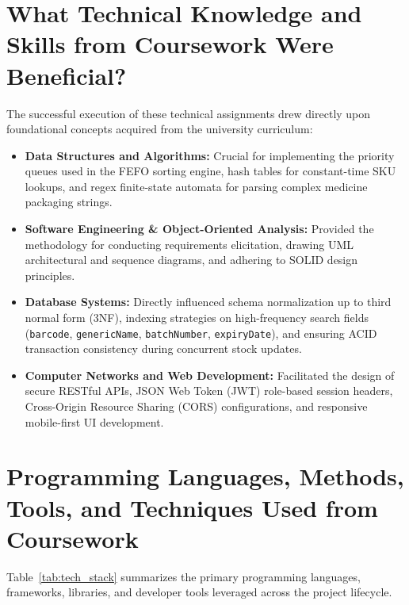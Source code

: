 \section{What Technical Knowledge and Skills from Coursework Were Beneficial?}
The successful execution of these technical assignments drew directly upon foundational concepts acquired from the university curriculum:
\begin{itemize}
    \item \textbf{Data Structures and Algorithms:} Crucial for implementing the priority queues used in the FEFO sorting engine, hash tables for constant-time SKU lookups, and regex finite-state automata for parsing complex medicine packaging strings.
    \item \textbf{Software Engineering \& Object-Oriented Analysis:} Provided the methodology for conducting requirements elicitation, drawing UML architectural and sequence diagrams, and adhering to SOLID design principles.
    \item \textbf{Database Systems:} Directly influenced schema normalization up to third normal form (3NF), indexing strategies on high-frequency search fields (\texttt{barcode}, \texttt{genericName}, \texttt{batchNumber}, \texttt{expiryDate}), and ensuring ACID transaction consistency during concurrent stock updates.
    \item \textbf{Computer Networks and Web Development:} Facilitated the design of secure RESTful APIs, JSON Web Token (JWT) role-based session headers, Cross-Origin Resource Sharing (CORS) configurations, and responsive mobile-first UI development.
\end{itemize}

\section{Programming Languages, Methods, Tools, and Techniques Used from Coursework}
Table~\ref{tab:tech_stack} summarizes the primary programming languages, frameworks, libraries, and developer tools leveraged across the project lifecycle.

